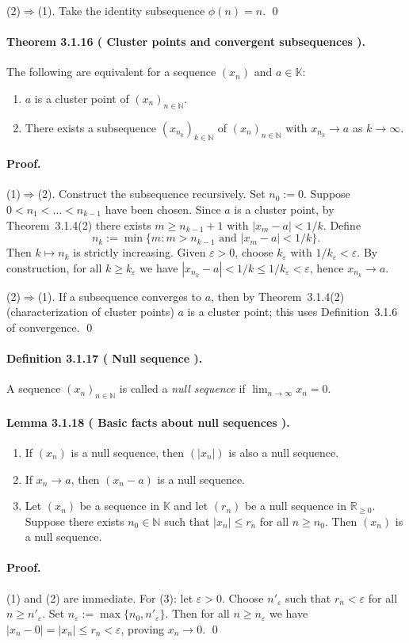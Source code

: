 \documentclass[12pt,a4paper]{article}
\newcommand{\N}{\mathbb{N}}
\newcommand{\R}{\mathbb{R}}
\newcommand{\K}{\mathbb{K}} %
\newcommand{\eps}{\varepsilon}
\newcommand{\NumberedDefinition}[3]{%
\paragraph*{Definition #1 ( #2 ).} #3\par}
\newcommand{\NumberedTheorem}[3]{%
\paragraph*{Theorem #1 ( #2 ).} #3\par}
\newcommand{\NumberedLemma}[3]{%
\paragraph*{Lemma #1 ( #2 ).} #3\par}
\theoremstyle{plain}
\theoremstyle{definition}
\theoremstyle{remark}
\begin{document}
(2)$\Rightarrow$(1). Take the identity subsequence $\phi(n)=n$. \qed

\NumberedTheorem{3.1.16}{Cluster points and convergent subsequences}{The following are equivalent for a sequence $(x_n)$ and $a\in\K$:
\begin{enumerate}[label={(\arabic*)}, leftmargin=*]
	\item $a$ is a cluster point of $(x_n)_{n\in\N}$.
	\item There exists a subsequence $(x_{n_k})_{k\in\N}$ of $(x_n)_{n\in\N}$ with $x_{n_k}\to a$ as $k\to\infty$.
\end{enumerate}}

\paragraph{Proof.} (1)$\Rightarrow$(2). Construct the subsequence recursively. Set $n_0:=0$. Suppose $0<n_1<\dots<n_{k-1}$ have been chosen. Since $a$ is a cluster point, by Theorem~3.1.4(2) there exists $m\ge n_{k-1}+1$ with $|x_m-a|<1/k$. Define
\[
	n_k := \min\{ m : m>n_{k-1} \text{ and } |x_m-a|< 1/k\}.
\]
Then $k\mapsto n_k$ is strictly increasing. Given $\eps>0$, choose $k_\eps$ with $1/k_\eps<\eps$. By construction, for all $k\ge k_\eps$ we have $|x_{n_k}-a|<1/k\le 1/k_\eps<\eps$, hence $x_{n_k}\to a$.

(2)$\Rightarrow$(1). If a subsequence converges to $a$, then by Theorem~3.1.4(2) (characterization of cluster points) $a$ is a cluster point; this uses Definition~3.1.6 of convergence. \qed

\NumberedDefinition{3.1.17}{Null sequence}{A sequence $(x_n)_{n\in\N}$ is called a \emph{null sequence} if $\lim_{n\to\infty} x_n=0$.}

\NumberedLemma{3.1.18}{Basic facts about null sequences}{
\begin{enumerate}[label={(\arabic*)}, leftmargin=*]
	\item If $(x_n)$ is a null sequence, then $(|x_n|)$ is also a null sequence.
	\item If $x_n\to a$, then $(x_n-a)$ is a null sequence.
	\item Let $(x_n)$ be a sequence in $\K$ and let $(r_n)$ be a null sequence in $\R_{\ge0}$. Suppose there exists $n_0\in\N$ such that $|x_n|\le r_n$ for all $n\ge n_0$. Then $(x_n)$ is a null sequence.
\end{enumerate}}

\paragraph{Proof.} (1) and (2) are immediate. For (3): let $\eps>0$. Choose $n'_\eps$ such that $r_n<\eps$ for all $n\ge n'_\eps$. Set $n_\eps:=\max\{n_0,n'_\eps\}$. Then for all $n\ge n_\eps$ we have $|x_n-0|=|x_n|\le r_n<\eps$, proving $x_n\to0$. \qed
\end{document}
